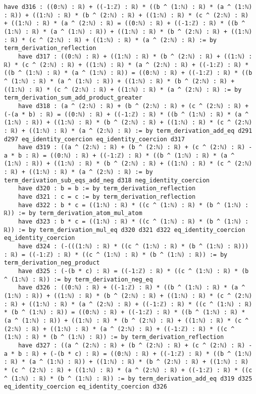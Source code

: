 \documentclass{article}
\begin{document}
\begin{tcolorbox}[colback=white!10, width=\linewidth]
\begin{lstlisting}[language=Lean4]
    have d316 : ((0:ℕ) : ℝ) + ((-1:ℤ) : ℝ) * ((b ^ (1:ℕ) : ℝ) * (a ^ (1:ℕ) : ℝ)) + ((1:ℕ) : ℝ) * (b ^ (2:ℕ) : ℝ) + ((1:ℕ) : ℝ) * (c ^ (2:ℕ) : ℝ) + ((1:ℕ) : ℝ) * (a ^ (2:ℕ) : ℝ) = ((0:ℕ) : ℝ) + ((-1:ℤ) : ℝ) * ((b ^ (1:ℕ) : ℝ) * (a ^ (1:ℕ) : ℝ)) + ((1:ℕ) : ℝ) * (b ^ (2:ℕ) : ℝ) + ((1:ℕ) : ℝ) * (c ^ (2:ℕ) : ℝ) + ((1:ℕ) : ℝ) * (a ^ (2:ℕ) : ℝ) := by term_derivation_reflection
    have d317 : ((0:ℕ) : ℝ) + ((1:ℕ) : ℝ) * (b ^ (2:ℕ) : ℝ) + ((1:ℕ) : ℝ) * (c ^ (2:ℕ) : ℝ) + ((1:ℕ) : ℝ) * (a ^ (2:ℕ) : ℝ) + ((-1:ℤ) : ℝ) * ((b ^ (1:ℕ) : ℝ) * (a ^ (1:ℕ) : ℝ)) = ((0:ℕ) : ℝ) + ((-1:ℤ) : ℝ) * ((b ^ (1:ℕ) : ℝ) * (a ^ (1:ℕ) : ℝ)) + ((1:ℕ) : ℝ) * (b ^ (2:ℕ) : ℝ) + ((1:ℕ) : ℝ) * (c ^ (2:ℕ) : ℝ) + ((1:ℕ) : ℝ) * (a ^ (2:ℕ) : ℝ) := by term_derivation_sum_add_product_greater
    have d318 : (a ^ (2:ℕ) : ℝ) + (b ^ (2:ℕ) : ℝ) + (c ^ (2:ℕ) : ℝ) + (-(a * b) : ℝ) = ((0:ℕ) : ℝ) + ((-1:ℤ) : ℝ) * ((b ^ (1:ℕ) : ℝ) * (a ^ (1:ℕ) : ℝ)) + ((1:ℕ) : ℝ) * (b ^ (2:ℕ) : ℝ) + ((1:ℕ) : ℝ) * (c ^ (2:ℕ) : ℝ) + ((1:ℕ) : ℝ) * (a ^ (2:ℕ) : ℝ) := by term_derivation_add_eq d291 d297 eq_identity_coercion eq_identity_coercion d317
    have d319 : ((a ^ (2:ℕ) : ℝ) + (b ^ (2:ℕ) : ℝ) + (c ^ (2:ℕ) : ℝ) - a * b : ℝ) = ((0:ℕ) : ℝ) + ((-1:ℤ) : ℝ) * ((b ^ (1:ℕ) : ℝ) * (a ^ (1:ℕ) : ℝ)) + ((1:ℕ) : ℝ) * (b ^ (2:ℕ) : ℝ) + ((1:ℕ) : ℝ) * (c ^ (2:ℕ) : ℝ) + ((1:ℕ) : ℝ) * (a ^ (2:ℕ) : ℝ) := by term_derivation_sub_eqs_add_neg d318 neg_identity_coercion
    have d320 : b = b := by term_derivation_reflection
    have d321 : c = c := by term_derivation_reflection
    have d322 : b * c = ((1:ℕ) : ℝ) * ((c ^ (1:ℕ) : ℝ) * (b ^ (1:ℕ) : ℝ)) := by term_derivation_atom_mul_atom
    have d323 : b * c = ((1:ℕ) : ℝ) * ((c ^ (1:ℕ) : ℝ) * (b ^ (1:ℕ) : ℝ)) := by term_derivation_mul_eq d320 d321 d322 eq_identity_coercion eq_identity_coercion
    have d324 : (-(((1:ℕ) : ℝ) * ((c ^ (1:ℕ) : ℝ) * (b ^ (1:ℕ) : ℝ))) : ℝ) = ((-1:ℤ) : ℝ) * ((c ^ (1:ℕ) : ℝ) * (b ^ (1:ℕ) : ℝ)) := by term_derivation_neg_product
    have d325 : (-(b * c) : ℝ) = ((-1:ℤ) : ℝ) * ((c ^ (1:ℕ) : ℝ) * (b ^ (1:ℕ) : ℝ)) := by term_derivation_neg_eq
    have d326 : ((0:ℕ) : ℝ) + ((-1:ℤ) : ℝ) * ((b ^ (1:ℕ) : ℝ) * (a ^ (1:ℕ) : ℝ)) + ((1:ℕ) : ℝ) * (b ^ (2:ℕ) : ℝ) + ((1:ℕ) : ℝ) * (c ^ (2:ℕ) : ℝ) + ((1:ℕ) : ℝ) * (a ^ (2:ℕ) : ℝ) + ((-1:ℤ) : ℝ) * ((c ^ (1:ℕ) : ℝ) * (b ^ (1:ℕ) : ℝ)) = ((0:ℕ) : ℝ) + ((-1:ℤ) : ℝ) * ((b ^ (1:ℕ) : ℝ) * (a ^ (1:ℕ) : ℝ)) + ((1:ℕ) : ℝ) * (b ^ (2:ℕ) : ℝ) + ((1:ℕ) : ℝ) * (c ^ (2:ℕ) : ℝ) + ((1:ℕ) : ℝ) * (a ^ (2:ℕ) : ℝ) + ((-1:ℤ) : ℝ) * ((c ^ (1:ℕ) : ℝ) * (b ^ (1:ℕ) : ℝ)) := by term_derivation_reflection
    have d327 : ((a ^ (2:ℕ) : ℝ) + (b ^ (2:ℕ) : ℝ) + (c ^ (2:ℕ) : ℝ) - a * b : ℝ) + (-(b * c) : ℝ) = ((0:ℕ) : ℝ) + ((-1:ℤ) : ℝ) * ((b ^ (1:ℕ) : ℝ) * (a ^ (1:ℕ) : ℝ)) + ((1:ℕ) : ℝ) * (b ^ (2:ℕ) : ℝ) + ((1:ℕ) : ℝ) * (c ^ (2:ℕ) : ℝ) + ((1:ℕ) : ℝ) * (a ^ (2:ℕ) : ℝ) + ((-1:ℤ) : ℝ) * ((c ^ (1:ℕ) : ℝ) * (b ^ (1:ℕ) : ℝ)) := by term_derivation_add_eq d319 d325 eq_identity_coercion eq_identity_coercion d326

\end{lstlisting}
\end{tcolorbox}
\end{document}
